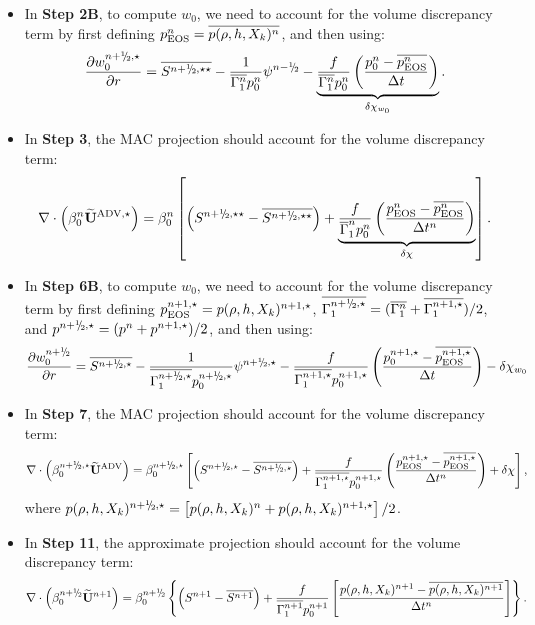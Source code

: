 \begin{itemize}
\item In {\bf Step 2B}, to compute $w_0$, we need to account for the volume discrepancy
term by first defining $p_{\rm EOS}^n = \overline{p(\rho,h,X_k)^n}$, and then using:
\begin{equation}
\frac{\partial w_0^{\nph,\star}}{\partial r} = \overline{S^{\nph,\star\star}} - \frac{1}{\overline{\Gamma_1^n}p_0^n}\psi^{\nmh} - \underbrace{\frac{f}{\overline{\Gamma_1^n}p_0^n}\left(\frac{p_0^n-\overline{p_{\rm EOS}^n}}{\Delta t}\right)}_{\delta\chi_{w_0}}.
\end{equation}
\item In {\bf Step 3}, the MAC projection should account for the volume discrepancy term:
\begin{equation}
\nabla \cdot \left(\beta_0^n \uadvone\right) = 
\beta_0^n \left[ \left(S^{\nph,\star\star} - \overline{S^{\nph,\star\star}}\right)
+ \underbrace{\frac{f}{\gammabar^n p_0^n}
\left(\frac{p_{\rm EOS}^n - \overline{p_{\rm EOS}^n}}{\Delta t^n}\right)}_{\delta\chi}\right].
\end{equation}
\item In {\bf Step 6B}, to compute $w_0$, we need to account for the volume discrepancy
term by first defining $p_{\rm EOS}^{n+1,\star} = p(\rho,h,X_k)^{n+1,\star}$,
$\overline{\Gamma_1^{\nph,\star}} = (\overline{\Gamma_1^{n}}+\overline{\Gamma_1^{n+1,\star}})/2$,
and $p^{\nph,\star} = (p^{n}+p^{n+1,\star})/2$, and then using:
\begin{equation}
\frac{\partial w_0^{\nph}}{\partial r} = \overline{S^{\nph,\star}} - \frac{1}{\overline{\Gamma_1^{\nph,\star}}p_0^{\nph,\star}}\psi^{\nph,\star} - \frac{f}{\overline{\Gamma_1^{n+1,\star}}p_0^{n+1,\star}}\left(\frac{p_0^{n+1,\star}-\overline{p_{\rm EOS}^{n+1,\star}}}{\Delta t}\right) - \delta\chi_{w_0}
\end{equation}
\item In {\bf Step 7}, the MAC projection should account for the volume discrepancy term:
\begin{equation}
\nabla \cdot \left(\beta_0^{\nph,\star} \uadvtwo\right) = \beta_0^{\nph,\star}\left[\left(S^{\nph,\star} - \overline{S^{\nph,\star}}\right) + \frac{f}{\overline{\Gamma_1^{n+1,\star}} p_0^{n+1,\star}} \left(\frac{p_{\rm EOS}^{n+1,\star} - \overline{p_{\rm EOS}^{n+1,\star}}}{\Delta t^n}\right) + \delta\chi\right],
\end{equation}
where $p(\rho,h,X_k)^{\nph,\star} = \left[p(\rho,h,X_k)^n +p(\rho,h,X_k)^{n+1,\star}\right]/2$.
\item In {\bf Step 11}, the approximate projection should account for the volume
discrepancy term:
\begin{equation}
\nabla \cdot \left(\beta_0^{\nph} \Ubt^{n+1} \right)  = \beta_0^{\nph}\left\{  \left(S^{n+1} - \overline{S^{n+1}} \right)
+ \frac{f}{\overline{\Gamma_1^{n+1}} p_0^{n+1}}
\left[\frac{p(\rho,h,X_k)^{n+1} - \overline{p(\rho,h,X_k)^{n+1}}}{\Delta t^n}\right]\right\}.
\end{equation}
\end{itemize}


